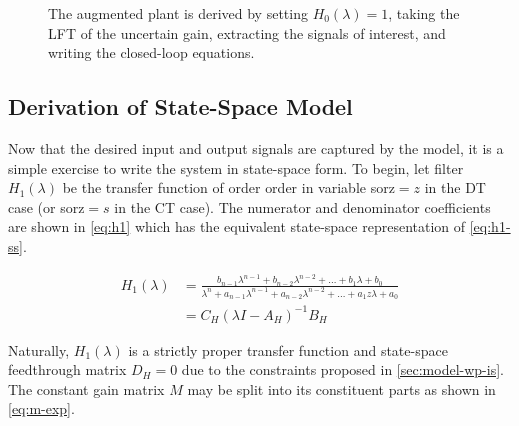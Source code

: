 \begin{figure}
	\caption{The augmented plant is derived by setting $H_0(\lambda) = 1$, taking the LFT of the uncertain gain, extracting the signals of interest, and writing the closed-loop equations.} \label{fig:sdm-aug}
\end{figure}

\subsection{Derivation of State-Space Model}

Now that the desired input and output signals are captured by the model, it is a simple exercise to write the system in state-space form. To begin, let filter $H_1(\lambda)$ be the transfer function of order \gls{order} in variable \gls{sorz}$ = z$ in the \gls{DT} case (or \gls{sorz}$ = s$ in the \gls{CT} case). The numerator and denominator coefficients are shown in \autoref{eq:h1} which has the equivalent state-space representation of \autoref{eq:h1-ss}.

\begin{align}
	H_1(\lambda) &= \frac{b_{n-1}\lambda^{n-1} + b_{n-2}\lambda^{n-2} + \ldots + b_1\lambda + b_0}{\lambda^n + a_{n-1}\lambda^{n-1} + a_{n-2}\lambda^{n-2} + \ldots + a_1z\lambda + a_0} \label{eq:h1} \\
	&= C_H(\lambda I - A_H)^{-1}B_H \label{eq:h1-ss}
\end{align}

Naturally, $H_1(\lambda)$ is a strictly proper transfer function and state-space feedthrough matrix $D_H = 0$ due to the constraints proposed in \autoref{sec:model-wp-is}. The constant gain matrix $M$ may be split into its constituent parts as shown in \autoref{eq:m-exp}.

